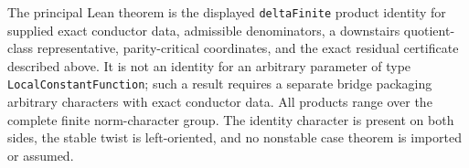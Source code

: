 \begin{theorem}
\leanok
{}
\FormalizationContract
The principal Lean theorem is the displayed \texttt{deltaFinite} product
identity for supplied exact conductor data, admissible denominators, a
downstairs quotient-class representative, parity-critical coordinates, and
the exact residual certificate described above.  It is not an identity for
an arbitrary parameter of type \texttt{LocalConstantFunction}; such a result
requires a separate bridge packaging arbitrary characters with exact
conductor data.  All products range over the complete finite norm-character
group.  The identity character is present on both sides, the stable twist is
left-oriented, and no nonstable case theorem is imported or assumed.
\end{theorem}
